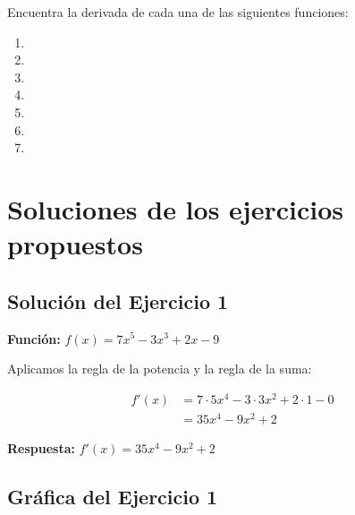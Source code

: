 \documentclass[12pt,a4paper]{article}
\begin{document}
Encuentra la derivada de cada una de las siguientes funciones:

\begin{enumerate}
	\item {\color{red}{$f(x) = 7x^5 - 3x^3 + 2x - 9$}}

	\item {}

	\item {\color{red}{$f(x) = (x^2 + 1)(x^3 - 2x)$}}

	\item {}

	\item {\color{red}{$f(x) = (4x^2 - 3x + 1)^6$}}

	\item {\color{red}{$f(x) = x^4(2x - 3)^3$}}

	\item {}
\end{enumerate}

\section{Soluciones de los ejercicios propuestos}

\subsection*{Solución del Ejercicio 1}

\textbf{Función:} $f(x) = 7x^5 - 3x^3 + 2x - 9$

\bigskip

Aplicamos la regla de la potencia y la regla de la suma:

\begin{align*}
f'(x) &= 7 \cdot 5x^4 - 3 \cdot 3x^2 + 2 \cdot 1 - 0 \\
&= 35x^4 - 9x^2 + 2
\end{align*}

\textbf{Respuesta:} $\boxed{f'(x) = 35x^4 - 9x^2 + 2}$

\subsection*{Gráfica del Ejercicio 1}
\end{document}
